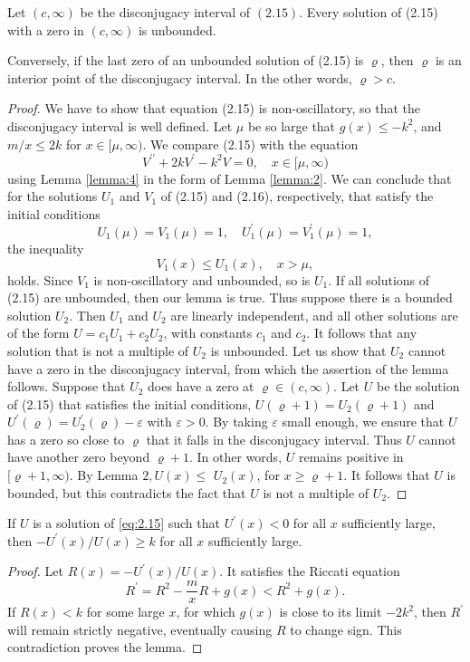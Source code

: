 \begin{lemma}\label{lemma:6}
  Let $(c, \infty)$ be the disconjugacy interval of $(2.15)$. 
  Every solution of (2.15) with a zero in $(c, \infty)$ is unbounded.
  
  Conversely, if the last zero of an unbounded solution of (2.15) is $\varrho$,
  then $\varrho$ is an interior point of the disconjugacy interval. In the other words, $\varrho>c$.
\end{lemma}

\begin{proof}
  We have to show that equation (2.15) is non-oscillatory, so that the disconjugacy interval is well defined.
  Let $\mu$ be so large that $g(x) \leq-k^2$, and $m / x \leq 2 k$ for $x \in[\mu, \infty)$.
  We compare (2.15) with the equation
  \[
  V^{\prime \prime}+2 k V^{\prime}-k^2 V=0, \quad x \in[\mu, \infty)
  \]
  using Lemma \ref{lemma:4} in the form of Lemma \ref{lemma:2}.
  We can conclude that for the solutions $U_1$ and $V_1$ of (2.15) and (2.16), respectively,
  that satisfy the initial conditions
  \[
  U_1(\mu)=V_1(\mu)=1, \quad U_1^{\prime}(\mu)=V_1^{\prime}(\mu)=1,
  \]
  the inequality
  \[
  V_1(x) \leq U_1(x), \quad x>\mu,
  \]
  holds. Since $V_1$ is non-oscillatory and unbounded, so is $U_1$. If all solutions of (2.15) are
  unbounded, then our lemma is true. Thus suppose there is a bounded solution $U_2$.
  Then $U_1$ and $U_2$ are linearly independent, and all other solutions are of the 
  form $U=c_1 U_1+c_2 U_2$, with constants $c_1$ and $c_2$. It follows that any solution that is not a 
  multiple of $U_2$ is unbounded. Let us show that $U_2$ cannot have a zero in the disconjugacy interval, 
  from which the assertion of the lemma follows. Suppose that $U_2$ does have a zero
  at $\varrho \in(c, \infty)$. Let $U$ be the solution of (2.15) that satisfies the initial conditions,
  $U(\varrho+1)=U_2(\varrho+1)$ and $U^{\prime}(\varrho)=U_2^{\prime}(\varrho)-\varepsilon$ with 
  $\varepsilon>0$. By taking $\varepsilon$ small enough, we ensure that $U$ has a zero so close to 
  $\varrho$ that it falls in the disconjugacy interval. Thus $U$ cannot have another zero 
  beyond $\varrho+1$. In other words, $U$ remains positive in $[\varrho+1, \infty)$.
  By Lemma $2, U(x) \leq$ $U_2(x)$, for $x \geq \varrho+1$. It follows that $U$ is bounded,
  but this contradicts the fact that $U$ is not a multiple of $U_2$.
\end{proof}

\begin{lemma}\label{lemma:7}
  If $U$ is a solution of \eqref{eq:2.15} such that $U^{\prime}(x)<0$ for all $x$ sufficiently large,
  then $-U^{\prime}(x) / U(x) \geq k$ for all $x$ sufficiently large.
\end{lemma}

\begin{proof}
  Let $R(x)=-U^{\prime}(x) / U(x)$. It satisfies the Riccati equation
  \[
  R^{\prime}=R^2-\frac{m}{x} R+g(x)<R^2+g(x) .
  \]
  If $R(x)<k$ for some large $x$, for which $g(x)$ is close to its limit $-2 k^2$,
  then $R^{\prime}$ will remain strictly negative, eventually causing $R$ to change sign.
  This contradiction proves the lemma.
\end{proof}